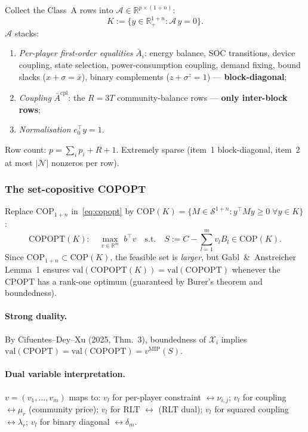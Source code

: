 \documentclass[11pt]{article}
\theoremstyle{definition}
\newcommand{\R}{\mathbb{R}}
\newcommand{\N}{\mathcal{N}}
\newcommand{\feas}{\mathcal{X}}
\newcommand{\vmip}{v^{\mathrm{MIP}}}
\begin{document}
Collect the Class~A rows into
$\mathcal{A}\in\R^{p\times(1+n)}$:
\begin{equation}
K:=\bigl\{y\in\R^{1+n}_+:\mathcal{A}\,y=0\bigr\}.
\label{eq:ground-cone}
\end{equation}
$\mathcal{A}$ stacks:
\begin{enumerate}[leftmargin=1.6em]
\item \emph{Per-player first-order equalities} $\bar A_i$:
  energy balance, SOC transitions, device coupling, state selection,
  power-consumption coupling, demand fixing, bound slacks
  ($x+\sigma=\bar x$), binary complements ($z+\sigma^{z}=1$)
  --- \textbf{block-diagonal};
\item \emph{Coupling} $\bar A^{\mathrm{cpl}}$: the $R=3T$
  community-balance rows --- \textbf{only inter-block rows};
\item \emph{Normalisation} $e_0^{\top}y=1$.
\end{enumerate}
Row count: $p=\sum_i p_i+R+1$.  Extremely sparse (item~1
block-diagonal, item~2 at most $|\N|$ nonzeros per row).

\subsubsection{The set-copositive COPOPT}

Replace $\mathrm{COP}_{1+n}$ in~\eqref{eq:copopt} by
$\mathrm{COP}(K)=\{M\in\mathcal{S}^{1+n}:y^{\top}My\ge0\;\forall y\in K\}$:
\begin{equation}
\mathrm{COPOPT}(K):\quad
\max_{v\in\R^m}\;b^{\top}v
\quad\text{s.t.}\quad
S:=C-\textstyle\sum_{l=1}^{m}v_lB_l\in\mathrm{COP}(K).
\label{eq:copopt-K}
\end{equation}
Since $\mathrm{COP}_{1+n}\subset\mathrm{COP}(K)$, the feasible set
is \emph{larger}, but Gabl~\&~Anstreicher Lemma~1 ensures
$\mathrm{val}(\mathrm{COPOPT}(K))=\mathrm{val}(\mathrm{COPOPT})$
whenever the CPOPT has a rank-one optimum (guaranteed by Burer's
theorem and boundedness).

\paragraph{Strong duality.}
By Cifuentes--Dey--Xu (2025, Thm.~3), boundedness of $\feas_i$ implies
$\mathrm{val}(\mathrm{CPOPT})=\mathrm{val}(\mathrm{COPOPT})=\vmip(S)$.

\paragraph{Dual variable interpretation.}
$v=(v_1,\dots,v_m)$ maps to:
$v_l$ for per-player constraint $\leftrightarrow\nu_{i,j}$;
$v_l$ for coupling $\leftrightarrow\mu_r$ (community price);
$v_l$ for RLT $\leftrightarrow$ (RLT dual);
$v_l$ for squared coupling $\leftrightarrow\lambda_r$;
$v_l$ for binary diagonal $\leftrightarrow\delta_m$.
\end{document}
